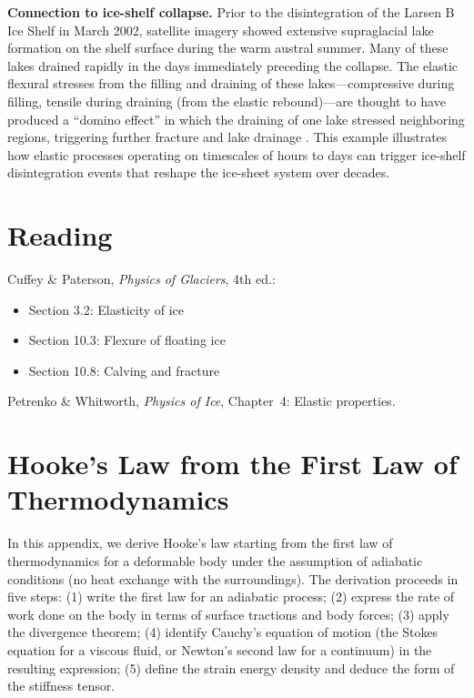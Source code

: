 \documentclass[11pt]{article}
\begin{document}
\medskip
\noindent\textbf{Connection to ice-shelf collapse.}  Prior to the disintegration of the Larsen B Ice Shelf in March 2002, satellite imagery showed extensive supraglacial lake formation on the shelf surface during the warm austral summer.  Many of these lakes drained rapidly in the days immediately preceding the collapse.  The elastic flexural stresses from the filling and draining of these lakes---compressive during filling, tensile during draining (from the elastic rebound)---are thought to have produced a ``domino effect'' in which the draining of one lake stressed neighboring regions, triggering further fracture and lake drainage \cite{BanwellMacAyeal2013}.  This example illustrates how elastic processes operating on timescales of hours to days can trigger ice-shelf disintegration events that reshape the ice-sheet system over decades.

\clearpage
\section*{Reading}

Cuffey \& Paterson, \textit{Physics of Glaciers}, 4th ed.:
\begin{itemize}
  \item Section 3.2: Elasticity of ice
  \item Section 10.3: Flexure of floating ice
  \item Section 10.8: Calving and fracture
\end{itemize}

\noindent Petrenko \& Whitworth, \textit{Physics of Ice}, Chapter~4: Elastic properties.

\clearpage
\appendix
\section{Hooke's Law from the First Law of Thermodynamics}
\label{app:hookes_law}

In this appendix, we derive Hooke's law starting from the first law of thermodynamics for a deformable body under the assumption of adiabatic conditions (no heat exchange with the surroundings).  The derivation proceeds in five steps: (1) write the first law for an adiabatic process; (2) express the rate of work done on the body in terms of surface tractions and body forces; (3) apply the divergence theorem; (4) identify Cauchy's equation of motion (the Stokes equation for a viscous fluid, or Newton's second law for a continuum) in the resulting expression; (5) define the strain energy density and deduce the form of the stiffness tensor.
\end{document}
